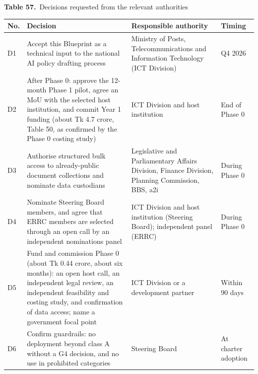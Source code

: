 \documentclass[border=10pt]{standalone}
\begin{document}
\begin{minipage}{17cm}
{\large\bfseries Table 57.}\ {\large Decisions requested from the relevant authorities}\par\vspace{7pt}
\small
{}
\begin{tabularx}{\linewidth}{@{}>{\hsize=0.276\hsize\raggedright\arraybackslash}X>{\hsize=2.023\hsize\raggedright\arraybackslash}X>{\hsize=1.103\hsize\raggedright\arraybackslash}X>{\hsize=0.598\hsize\raggedright\arraybackslash}X@{}}
\arrayrulecolor{bapilrule}\toprule
\rowcolor{white}\textbf{No.} & \textbf{Decision} & \textbf{Responsible authority} & \textbf{Timing} \\
\midrule
D1 & Accept this Blueprint as a technical input to the national AI policy drafting process & Ministry of Posts, Telecommunications and Information Technology (ICT Division) & Q4 2026 \\
D2 & After Phase 0: approve the 12-month Phase 1 pilot, agree an MoU with the selected host institution, and commit Year 1 funding (about Tk 4.7 crore, Table 50, as confirmed by the Phase 0 costing study) & ICT Division and host institution & End of Phase 0 \\
D3 & Authorise structured bulk access to already-public document collections and nominate data custodians & Legislative and Parliamentary Affairs Division, Finance Division, Planning Commission, BBS, a2i & During Phase 0 \\
D4 & Nominate Steering Board members, and agree that ERRC members are selected through an open call by an independent nominations panel & ICT Division and host institution (Steering Board); independent panel (ERRC) & During Phase 0 \\
D5 & Fund and commission Phase 0 (about Tk 0.44 crore, about six months): an open host call, an independent legal review, an independent feasibility and costing study, and confirmation of data access; name a government focal point & ICT Division or a development partner & Within 90 days \\
D6 & Confirm guardrails: no deployment beyond class A without a G4 decision, and no use in prohibited categories & Steering Board & At charter adoption \\
\bottomrule
\end{tabularx}
\par\vspace{5pt}{\footnotesize\itshape In time, D1 and D5 come first; D3 and D4 are prepared during Phase 0; D2 follows Phase 0 and D6 the adoption of the charter. None of these decisions creates a statutory body or gives BAPIL legal powers. The approvals and agreements needed before month 1 are listed in Annex T (Table 65).}
\par{}
\end{minipage}
\end{document}
